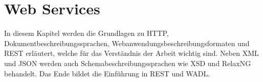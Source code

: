 \chapter{Web Services}
\label{sec:web_services}


In diesem Kapitel werden die Grundlagen zu HTTP, Dokumentbeschreibungssprachen, Webanwendungsbeschreibungsformaten und \gls{REST} erläutert, welche für das Verständnis der Arbeit wichtig sind. 
Neben \gls{XML} und  \gls{JSON} werden auch Schemabeschreibungssprachen wie \gls{XSD} und \gls{RelaxNG} behandelt.
Das Ende bildet die Einführung in \gls{REST} und \gls{WADL}.









